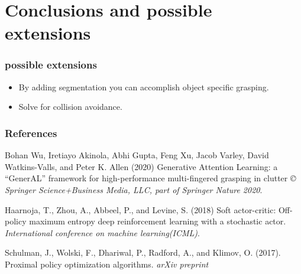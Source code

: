 \documentclass{beamer}
\begin{document}
\section{Conclusions and possible extensions}

\begin{frame}\frametitle{possible extensions}
\begin{itemize}
\item By adding segmentation you can accomplish object specific grasping.
\item Solve for collision avoidance.
\end{itemize}
\end{frame}

\begin{frame}
\frametitle{References}
\footnotesize{
\begin{thebibliography}{99} %
 Bohan Wu,  Iretiayo Akinola,  Abhi Gupta,  Feng Xu,  Jacob Varley,  David Watkins-Valls, and Peter K. Allen (2020)
\newblock Generative Attention Learning: a “GenerAL” framework for
high-performance multi-fingered grasping in clutter
\newblock \emph{© Springer Science+Business Media, LLC, part of Springer Nature 2020}.

 Haarnoja, T., Zhou, A., Abbeel, P., and Levine, S. (2018)
\newblock Soft actor-critic: Off-policy maximum entropy deep reinforcement learning with a stochastic actor.
\newblock \emph{International conference on machine learning(ICML)}.

 Schulman, J., Wolski, F., Dhariwal, P., Radford, A., and  Klimov, O. (2017).
\newblock Proximal policy optimization algorithms. 
\newblock \emph{arXiv preprint}
\end{thebibliography}
}
\end{frame}


\end{document}
